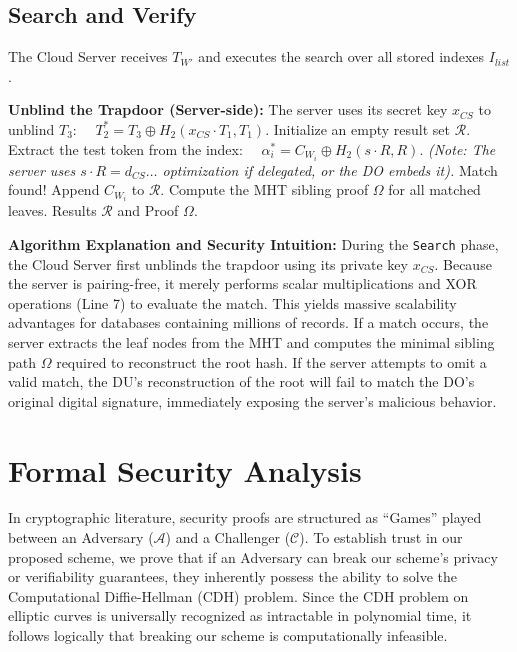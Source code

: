 \documentclass[10pt,journal,compsoc]{IEEEtran}
\begin{document}
\subsection{Search and Verify}
The Cloud Server receives $T_{W'}$ and executes the search over all stored indexes $I_{list}$.

\begin{algorithm}[H]
\caption{Search($T_{W'}$, $I_{list}$, $SK_{CS}$)}
\begin{algorithmic}[1]
\State \textbf{Unblind the Trapdoor (Server-side):}
\State The server uses its secret key $x_{CS}$ to unblind $T_3$:
\Statex $\quad T_2^* = T_3 \oplus H_2(x_{CS} \cdot T_1, T_1)$.
\State Initialize an empty result set $\mathcal{R}$.
    \State Extract the test token from the index:
    \Statex $\quad \alpha_i^* = C_{W_i} \oplus H_2(s \cdot R, R)$. 
    \State \textit{(Note: The server uses $s \cdot R = d_{CS} \dots$ optimization if delegated, or the DO embeds it).}
        \State Match found! Append $C_{W_i}$ to $\mathcal{R}$.
    \EndIf
\EndFor
\State Compute the MHT sibling proof $\Omega$ for all matched leaves.
\State \Return Results $\mathcal{R}$ and Proof $\Omega$.
\end{algorithmic}
\end{algorithm}

\textbf{Algorithm Explanation and Security Intuition:} During the \texttt{Search} phase, the Cloud Server first unblinds the trapdoor using its private key $x_{CS}$. Because the server is pairing-free, it merely performs scalar multiplications and XOR operations (Line 7) to evaluate the match. This yields massive scalability advantages for databases containing millions of records. If a match occurs, the server extracts the leaf nodes from the MHT and computes the minimal sibling path $\Omega$ required to reconstruct the root hash. If the server attempts to omit a valid match, the DU's reconstruction of the root will fail to match the DO's original digital signature, immediately exposing the server's malicious behavior.


\section{Formal Security Analysis}\label{sec:security}
In cryptographic literature, security proofs are structured as ``Games'' played between an Adversary ($\mathcal{A}$) and a Challenger ($\mathcal{C}$). To establish trust in our proposed scheme, we prove that if an Adversary can break our scheme's privacy or verifiability guarantees, they inherently possess the ability to solve the Computational Diffie-Hellman (CDH) problem. Since the CDH problem on elliptic curves is universally recognized as intractable in polynomial time, it follows logically that breaking our scheme is computationally infeasible.
\end{document}

